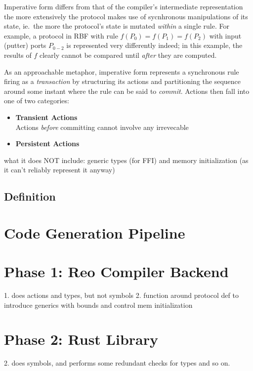 Imperative form differs from that of the compiler's intermediate representation the more extensively the protocol makes use of sycnhronous manipulations of its state, ie.\ the more the protocol's state is mutated \textit{within} a single rule. For example, a protocol in RBF with rule $f(P_0)=f(P_1)=f(P_2)$ with input (putter) ports $P_{0-2}$ is represented very differently indeed; in this example, the results of $f$ clearly cannot be compared until \textit{after} they are computed.

As an approachable metaphor, imperative form represents a synchronous rule firing as a \textit{transaction} by structuring its actions and partitioning the sequence around some instant where the rule can be said to \textit{commit}. Actions then fall into one of two categories:
\begin{itemize}
	\item \textbf{Transient Actions}\\
	Actions \textit{before} committing cannot involve any irrevecable 
	
	\item \textbf{Persistent Actions}\\
\end{itemize}


what it does NOT include: generic types (for FFI) and memory initialization (as it can't reliably represent it anyway)

\subsection{Definition}


\section{Code Generation Pipeline}
\section{Phase 1: Reo Compiler Backend}
1. does actions and types, but not symbols
2. function around protocol def to introduce generics with bounds and control mem initialization

\section{Phase 2: Rust Library}
2. does symbols, and performs some redundant checks for types and so on.